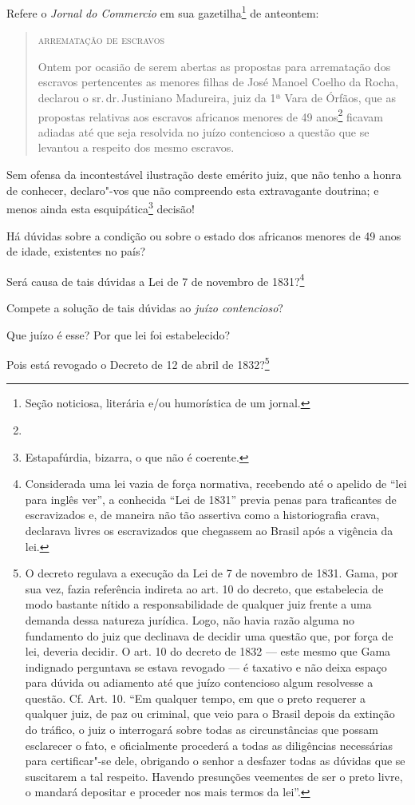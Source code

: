 \noindent{}Refere o \emph{Jornal do Commercio} em sua gazetilha\footnote{Seção
  noticiosa, literária e/ou humorística de um jornal.} de anteontem:

\begin{quote}
\textsc{arrematação de escravos}

Ontem por ocasião de serem abertas as propostas para arrematação dos
escravos pertencentes as menores filhas de José Manoel Coelho da Rocha,
declarou o sr.\,dr.\,Justiniano Madureira, juiz da 1ª Vara de Órfãos, que
as propostas relativas aos escravos africanos menores de 49
anos\footnote{} ficavam adiadas até que seja resolvida no juízo
contencioso a questão que se levantou a respeito dos mesmo escravos.
\end{quote}

Sem ofensa da incontestável ilustração deste emérito juiz, que não tenho
a honra de conhecer, declaro"-vos que não compreendo esta extravagante
doutrina; e menos ainda esta esquipática\footnote{Estapafúrdia,
  bizarra, o que não é coerente.} decisão!

Há dúvidas sobre a condição ou sobre o estado dos africanos menores de
49 anos de idade, existentes no país?

Será causa de tais dúvidas a Lei de 7 de novembro de 1831?\footnote{
  Considerada uma lei vazia de força normativa, recebendo até o apelido
  de ``lei para inglês ver'', a conhecida ``Lei de 1831'' previa penas para
  traficantes de escravizados e, de maneira não tão assertiva como a
  historiografia crava, declarava livres os escravizados que chegassem
  ao Brasil após a vigência da lei.}

Compete a solução de tais dúvidas ao \emph{juízo contencioso}?

Que juízo é esse? Por que lei foi estabelecido?

Pois está revogado o Decreto de 12 de abril de 1832?\footnote{O
  decreto regulava a execução da Lei de 7 de novembro de 1831. Gama, por
  sua vez, fazia referência indireta ao art. 10 do decreto, que
  estabelecia de modo bastante nítido a responsabilidade de qualquer
  juiz frente a uma demanda dessa natureza jurídica. Logo, não havia
  razão alguma no fundamento do juiz que declinava de decidir uma
  questão que, por força de lei, deveria decidir. O art. 10 do decreto
  de 1832 --- este mesmo que Gama indignado perguntava se estava revogado
  --- é taxativo e não deixa espaço para dúvida ou adiamento até que juízo
  contencioso algum resolvesse a questão. Cf. Art. 10. ``Em qualquer
  tempo, em que o preto requerer a qualquer juiz, de paz ou criminal,
  que veio para o Brasil depois da extinção do tráfico, o juiz o
  interrogará sobre todas as circunstâncias que possam esclarecer o
  fato, e oficialmente procederá a todas as diligências necessárias para
  certificar"-se dele, obrigando o senhor a desfazer todas as dúvidas que
  se suscitarem a tal respeito. Havendo presunções veementes de ser o
  preto livre, o mandará depositar e proceder nos mais termos da lei''.}

